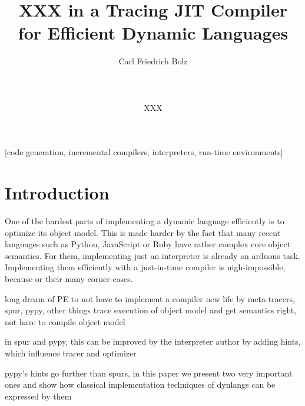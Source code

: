 \documentclass{sig-alternate}
\begin{document}
\title{XXX in a Tracing JIT Compiler for Efficient Dynamic Languages}

\author{
\alignauthor Carl Friedrich Bolz\\
       \\
       \\
       \\
\alignauthor XXX
       \\
}

\maketitle

[code generation,
incremental compilers, interpreters, run-time environments]

\begin{abstract}


\end{abstract}


\section{Introduction}

One of the hardest parts of implementing a dynamic language efficiently is to
optimize its object model. This is made harder by the fact that many recent
languages such as Python, JavaScript or Ruby have rather complex core object
semantics. For them, implementing just an interpreter is already an arduous
task. Implementing them efficiently with a just-in-time compiler is
nigh-impossible, because or their many corner-cases.

long dream of PE to not have to implement a compiler
new life by meta-tracers, spur, pypy, other things
trace execution of object model and get semantics right, not have to compile
object model

in spur and pypy, this can be improved by the interpreter author by adding
hints, which influence tracer and optimizer

pypy's hints go further than spurs, in this paper we present two very important
ones and show how classical implementation techniques of dynlangs can be
expressed by them
\end{document}
